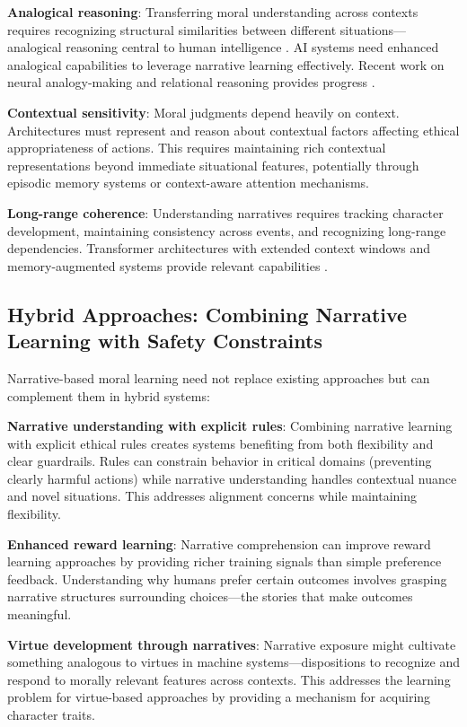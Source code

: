 \documentclass[12pt]{article}
\begin{document}
\textbf{Analogical reasoning}: Transferring moral understanding across contexts requires recognizing structural similarities between different situations---analogical reasoning central to human intelligence \citep{gentner1983structure}. AI systems need enhanced analogical capabilities to leverage narrative learning effectively. Recent work on neural analogy-making and relational reasoning provides progress \citep{webb2021emergent}.

\textbf{Contextual sensitivity}: Moral judgments depend heavily on context. Architectures must represent and reason about contextual factors affecting ethical appropriateness of actions. This requires maintaining rich contextual representations beyond immediate situational features, potentially through episodic memory systems or context-aware attention mechanisms.

\textbf{Long-range coherence}: Understanding narratives requires tracking character development, maintaining consistency across events, and recognizing long-range dependencies. Transformer architectures with extended context windows and memory-augmented systems provide relevant capabilities \citep{vaswani2017attention}.

\subsection{Hybrid Approaches: Combining Narrative Learning with Safety Constraints}

Narrative-based moral learning need not replace existing approaches but can complement them in hybrid systems:

\textbf{Narrative understanding with explicit rules}: Combining narrative learning with explicit ethical rules creates systems benefiting from both flexibility and clear guardrails. Rules can constrain behavior in critical domains (preventing clearly harmful actions) while narrative understanding handles contextual nuance and novel situations. This addresses alignment concerns while maintaining flexibility.

\textbf{Enhanced reward learning}: Narrative comprehension can improve reward learning approaches by providing richer training signals than simple preference feedback. Understanding why humans prefer certain outcomes involves grasping narrative structures surrounding choices---the stories that make outcomes meaningful.

\textbf{Virtue development through narratives}: Narrative exposure might cultivate something analogous to virtues in machine systems---dispositions to recognize and respond to morally relevant features across contexts. This addresses the learning problem for virtue-based approaches by providing a mechanism for acquiring character traits.
\end{document}
